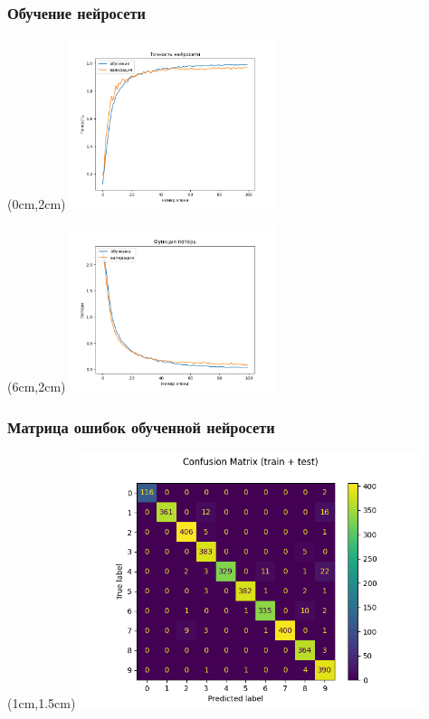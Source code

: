 \documentclass{beamer}
\begin{document}
\begin{frame}
\frametitle{Обучение нейросети}

\begin{textblock*}{6cm}(0cm,2cm)
\includegraphics[width=6cm]{model_accuracy}
\end{textblock*}

\begin{textblock*}{6cm}(6cm,2cm)
\includegraphics[width=6cm]{model_loss}
\end{textblock*}

\end{frame}

\begin{frame}
\frametitle{Матрица ошибок обученной нейросети}
\begin{textblock*}{10cm}(1cm,1.5cm)
\includegraphics[width=10cm]{net_confusion_matrix}
\end{textblock*}
\end{frame}
\end{document}
